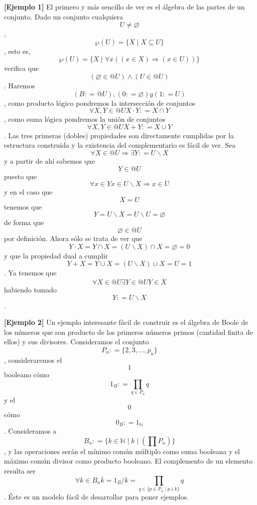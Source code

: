 \begin{enumerate}
  \textbf{{[}Ejemplo 1{]} }El primero y más sencillo de ver es el
  álgebra de las partes de un conjunto. Dado un conjunto
  cualquiera\[U \neq \varnothing\],
  \[{\wp(U)} = {\{{X \mid {X \subseteq U}}\}}\], esto es,
  \[{\wp(U)} = {\{{X \mid {{\forall x}\left( {{({x \in X})}\Rightarrow{({x \in U})}} \right)}}\}}\]
  verifica
  que\[\left( {{\varnothing \in @}U} \right) \land \left( {{U \in @}U} \right)\].
  Ha\-remos\[\left( {B{: = @}U} \right),\left( {0{: = \varnothing}} \right)y\left( {1{: = U}} \right)\],
  como producto lógico pondremos la intersección de
  conjuntos\[\forall X,{Y \in @}U{X \cdot Y}{: = {X \cap Y}}\], como
  suma lógica pondremos la unión de
  conjuntos\[\forall X,{Y \in @}U{X + Y}{: = {X \cup Y}}\]. Las tres
  primeras (dobles) propiedades son di\-rectamente cumplidas por la
  estructura construida y la existencia del complementario es fá\-cil de
  ver. Sea
  \[\forall{X \in @}U\Rightarrow\exists Y{: = {U \smallsetminus X}}\]y a
  partir de ahí sabemos que\[{Y \in @}U\]puesto
  que\[\forall{x \in Y}{x \in {U \smallsetminus X}}\Rightarrow{x \in U}\]y
  en el caso que\[X = U\]tenemos que
  \[{{Y = {U \smallsetminus X}} = {U \smallsetminus U}} = \varnothing\]de
  forma que\[{\varnothing \in @}U\]por definición. Ahora sólo se trata
  de ver
  que\[{{{{Y \cdot X} = {Y \cap X}} = {{({U \smallsetminus X})} \cap X}} = \varnothing} = 0\]y
  que la propiedad dual a
  cumplir\[{{{{Y + X} = {Y \cup X}} = {{({U \smallsetminus X})} \cup X}} = U} = 1\].
  Ya tenemos
  que\[\forall{X \in @}U\exists{Y \in @}U{Y \in \overline{X}}\]ha\-biendo
  tomado\[Y{: = {U \smallsetminus X}}\].

  \textbf{{[}Ejemplo 2{]}} Un ejemplo interesante fácil de construir es
  el álgebra de Boole de los números que son producto de los primeros
  núme\-ros primos (cantidad finita de ellos) y sus divisores.
  Consideramos el conjunto \[P_{n}{: = {\{{2,3,\ldots,p_{n}}\}}}\],
  con\-sideraremos el \[1\] booleano
  cómo\[1_{B}{: = {\prod\limits_{q \in P_{n}}q}}\]y el \[0\]
  cómo\[0_{B}{: = 1_{\mathbb{N}}}\]. Consideramos a
  \[B_{n}{: = {\{{{k \in \mathbb{N}} \mid {k \mid \left( {\prod P_{n}} \right)}}\}}}\],
  y las operaciones serán el mínimo común múltiplo como suma booleana y
  el máximo común divisor como producto booleano. El complemento de un
  ele\-mento resulta ser
  \[\forall{k \in B_{n}}{{\overline{k} = {1_{B}/k}} = {\prod\limits_{q \in {\{{{{p \in P_{n}} \mid p} \nmid k}\}}}q}}\].
  Éste es un modelo fácil de desarrollar para poner ejemplos.


\end{enumerate}
